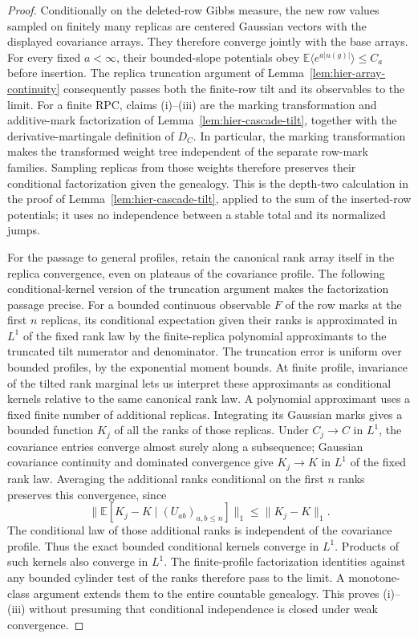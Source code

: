 \documentclass[11pt,a4paper]{article}
\numberwithin{equation}{section}
\theoremstyle{definition}
\theoremstyle{remark}
\newcommand{\E}{\mathbb E}
\begin{document}
\begin{proof}
Conditionally on the deleted-row Gibbs measure, the new row values sampled
on finitely many replicas are centered Gaussian vectors with the displayed
covariance arrays. They therefore converge jointly with the base arrays.
For every fixed $a<\infty$, their bounded-slope potentials obey
$\E\langle e^{a|u(g)|}\rangle\le C_a$ before insertion. The replica
truncation argument of Lemma~\ref{lem:hier-array-continuity} consequently
passes both the finite-row tilt and its observables to the limit.
For a finite RPC, claims (i)--(iii) are the marking transformation and
additive-mark factorization of Lemma~\ref{lem:hier-cascade-tilt}, together
with the derivative-martingale definition of $D_C$. In particular, the
marking transformation makes the transformed weight tree independent of
the separate row-mark families. Sampling replicas from those weights
therefore preserves their conditional factorization given the genealogy.
This is the depth-two calculation in the proof of
Lemma~\ref{lem:hier-cascade-tilt}, applied to the sum of the inserted-row
potentials; it uses no independence between a stable total and its
normalized jumps.

For the passage to general profiles, retain the canonical rank array itself
in the replica convergence, even on plateaus of the covariance profile.
The following conditional-kernel version of the truncation argument makes
the factorization passage precise. For a bounded continuous observable $F$
of the row marks at the first $n$ replicas, its conditional expectation
given their ranks is approximated in $L^1$ of the fixed rank law by the
finite-replica polynomial approximants to the truncated tilt numerator and
denominator. The truncation error is uniform over bounded profiles, by the
exponential moment bounds. At finite profile, invariance of the tilted rank marginal lets us
interpret these approximants as conditional kernels relative to the same
canonical rank law. A polynomial approximant uses a fixed finite number
of additional replicas. Integrating its Gaussian marks gives a bounded
function $K_j$ of all the ranks of those replicas. Under $C_j\to C$ in
$L^1$, the covariance entries converge almost surely along a subsequence;
Gaussian covariance continuity and dominated convergence give
$K_j\to K$ in $L^1$ of the fixed rank law. Averaging the additional ranks
conditional on the first $n$ ranks preserves this convergence, since
\[
 \big\|\E[K_j-K\mid(U_{ab})_{a,b\le n}]\big\|_1
       \le\|K_j-K\|_1.
\]
The conditional law of those additional ranks is independent of the
covariance profile. Thus the exact bounded conditional kernels converge in $L^1$.
Products of such kernels also converge in $L^1$. The finite-profile
factorization identities against any bounded cylinder test of the ranks
therefore pass to the limit. A monotone-class argument extends them to the
entire countable genealogy. This proves (i)--(iii) without presuming that
conditional independence is closed under weak convergence.


\end{proof}
\end{document}
